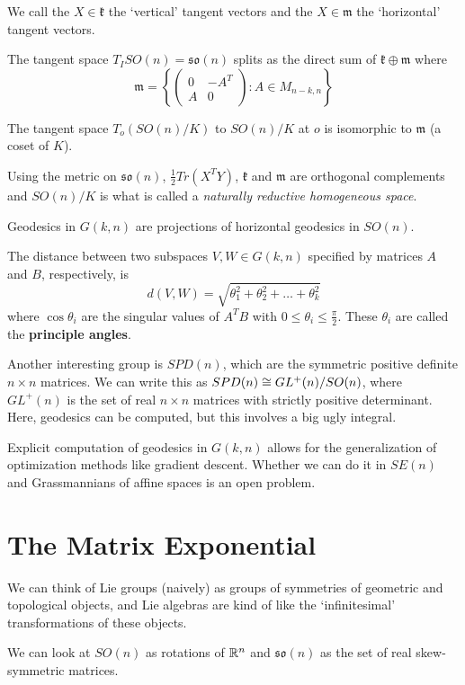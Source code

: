 We call the $X\in \mathfrak{k}$ the `vertical' tangent vectors and the $X\in \mathfrak{m}$ the `horizontal' tangent vectors.


The tangent space $T_ISO(n)=\mathfrak{so}(n)$ splits as the direct sum of $\mathfrak{k}\oplus \mathfrak{m}$ where 
$$\mathfrak{m}=\left\{  \begin{pmatrix} 0&-A^T\\A&0\end{pmatrix} : A\in M_{n-k,n}   \right\}$$

The tangent space $T_o(SO(n)/K)$ to $SO(n)/K$ at $o$ is isomorphic to $\mathfrak{m}$ (a coset of $K$).

Using the metric on $\mathfrak{so}(n)$, $\frac{1}{2}Tr(X^TY)$, $\mathfrak{k}$ and $\mathfrak{m}$ are orthogonal complements and $SO(n)/K$ is what is called a \textit{naturally reductive homogeneous space}.


Geodesics in $G(k,n)$ are projections of horizontal geodesics in $SO(n)$.

\begin{theorem}
	The distance between two subspaces $V,W\in G(k,n)$ specified by matrices $A$ and $B$, respectively, is $$d(V,W)=\sqrt{\theta_1^2+\theta_2^2+\dots+\theta_k^2}$$ where $\cos\theta_i$ are the singular values of $A^TB$ with $0\leq\theta_i\leq \frac{\pi}{2}$.  These $\theta_i$ are called the \textbf{principle angles}.
\end{theorem}


Another interesting group is $SPD(n)$, which are the symmetric positive definite $n\times n$ matrices.  We can write this as $SPD(n)\cong GL^+(n)/SO(n)$, where $GL^+(n)$ is the set of real $n\times n$ matrices with strictly positive determinant.  Here, geodesics can be computed, but this involves a big ugly integral.

Explicit computation of geodesics in $G(k,n)$ allows for the generalization of optimization methods like gradient descent.  Whether we can do it in $SE(n)$ and Grassmannians of affine spaces is an open problem.


\section*{The Matrix Exponential}


We can think of Lie groups (naively) as groups of symmetries of geometric and topological objects, and Lie algebras are kind of like the `infinitesimal' transformations of these objects.

We can look at $SO(n)$ as rotations of $\mathbb{R}^n$ and $\mathfrak{so}(n)$ as the set of real skew-symmetric matrices.  

